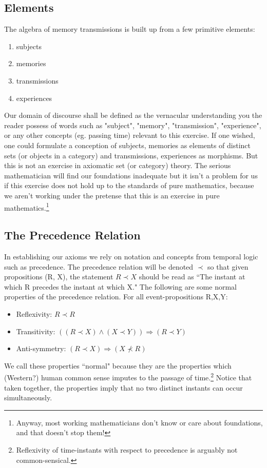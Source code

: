 \documentclass{article}
\begin{document}
\subsection*{Elements}
The algebra of memory transmissions is built up from a few primitive elements: 
\begin{enumerate}
    \item subjects
    \item memories
    \item transmissions
    \item experiences
\end{enumerate}Our domain of discourse shall be defined as the vernacular understanding you the reader possess of words such as "subject", "memory", "transmission", "experience", or any other concepts (eg. passing time) relevant to this exercise. If one wished, one could formulate a conception of subjects, memories as elements of distinct sets (or objects in a category) and transmissions, experiences as morphisms. But this is not an exercise in axiomatic set (or category) theory. The serious mathematician will find our foundations inadequate but it isn't a problem for us if this exercise does not hold up to the standards of pure mathematics, because we aren't working under the pretense that this is an exercise in pure mathematics.\footnote{Anyway, most working mathematicians don't know or care about foundations, and that doesn't stop them!}

\subsection*{The Precedence Relation}
In establishing our axioms we rely on notation and concepts from temporal logic such as precedence. The precedence relation will be denoted $\prec$ so that given propositions (R, X), the statement $R \prec X$ should be read as ``The instant at which R precedes the instant at which X." The following are some normal properties of the precedence relation. For all event-propositions R,X,Y:

\begin{itemize}
    \item Reflexivity: $R \prec R$
    \item Transitivity: $((R \prec X) \land (X \prec Y)) \Rightarrow (R \prec Y)$
    \item Anti-symmetry: $(R \prec X) \Rightarrow (X \nprec R)$
\end{itemize}

We call these properties ``normal" because they are the properties which (Western?) human common sense imputes to the passage of time.\footnote{Reflexivity of time-instants with respect to precedence is arguably not common-sensical.} Notice that taken together, the properties imply that no two distinct instants can occur simultaneously.
\end{document}

